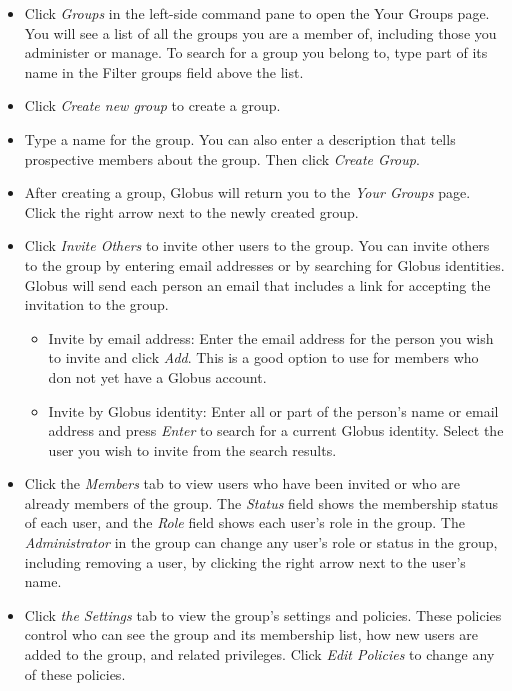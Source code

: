 \begin{itemize}
\item Click \emph{Groups} in the left-side command pane to open the Your Groups page. You will see a list of all the groups you are a member of, including those you administer or manage. To search for a group you belong to, type part of its name in the Filter groups field above the list.
\item Click \emph{Create new group} to create a group.
\item Type a name for the group. You can also enter a description that tells prospective members about the group. Then click \emph{Create Group}.
\item After creating a group, Globus will return you to the \emph{Your Groups} page. Click the right arrow next to the newly created group.
\item Click \emph{Invite Others} to invite other users to the group.
You can invite others to the group by entering email addresses or by searching for Globus identities. Globus will send each person an email that includes a link for accepting the invitation to the group.
\begin{itemize}
\item Invite by email address: Enter the email address for the person you wish to invite and click \emph{Add}. This is a good option to use for members who don not yet have a Globus account.
\item Invite by Globus identity: Enter all or part of the person's name or email address and press \emph{Enter} to search for a current Globus identity. Select the user you wish to invite from the search results.
\end{itemize}
\item Click the \emph{Members} tab to view users who have been invited or who are already members of the group. The \emph{Status} field shows the membership status of each user, and the \emph{Role} field shows each user's role in the group. The \emph{Administrator} in the group can change any user's role or status in the group, including removing a user, by clicking the right arrow next to the user's name.
\item Click \emph{the Settings} tab to view the group's settings and policies. These policies control who can see the group and its membership list, how new users are added to the group, and related privileges. Click \emph{Edit Policies} to change any of these policies.
\end{itemize}

